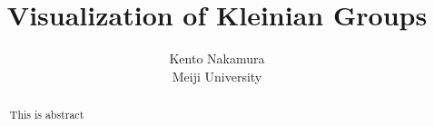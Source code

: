 \documentclass[uplatex, dvipdfmx]{article}
\title{ Visualization of Kleinian Groups }
\author{ Kento Nakamura\\
Meiji University\\
}
\date{}
\begin{document}
\maketitle

\begin{abstract}
This is abstract
\end{abstract}

\clearpage

\tableofcontents

\clearpage



\printbibliography
\end{document}
